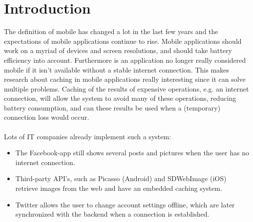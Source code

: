 \documentclass[pdftex,a4paper,12pt,twoside]{report}
\begin{document}
\tableofcontents



\chapter{Introduction}
\label{ch:introduction}
The definition of mobile has changed a lot in the last few years and the expectations of mobile applications continue to rise.
Mobile applications should work on a myriad of devices and screen resolutions, and should take battery efficiency into account.
Furthermore is an application no longer really considered mobile if it isn't available without a stable internet connection.
This makes research about caching in mobile applications really interesting since it can solve multiple problems.
Caching of the results of expensive operations, e.g. an internet connection, will allow the system to avoid many of these operations,
reducing battery consumption, and can these results be used when a (temporary) connection loss would occur.
\\\\
Lots of IT companies already implement such a system:
\begin{itemize}
\item The Facebook-app still shows several posts and pictures when the user has no internet connection.
\item Third-party API's, such as Picasso (Android) and SDWebImage (iOS) retrieve images from the web and have an embedded caching system.
\item Twitter allows the user to change account settings offline, which are later synchronized with the backend when a connection is established\footnotemark.
\end{itemize}
\newpage
\end{document}

